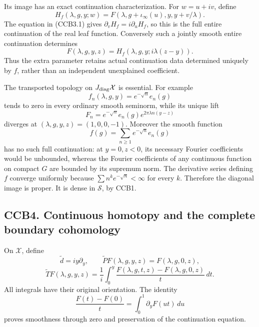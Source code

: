 Its image has an exact continuation characterization. For \(w=u+iv\),
define \[
H_f(\lambda,g,y;w)
=F(\lambda,g+\iota_\infty(u),y,y+v/\lambda).
\] The equation in (CCB3.1) gives \(\partial_vH_f=i\partial_uH_f\), so
this is the full entire continuation of the real leaf function.
Conversely such a jointly smooth entire continuation determines \[
F(\lambda,g,y,z)
=H_f(\lambda,g,y;i\lambda(z-y)).
\tag{CCB3.5}
\] Thus the extra parameter retains actual continuation data determined
uniquely by \(f\), rather than an independent unexplained coefficient.

The transported topology on \(J_{\rm diag}\mathcal X\) is essential. For
example \[
f_n(\lambda,g,y)=e^{-\sqrt n}e_n(g)
\] tends to zero in every ordinary smooth seminorm, while its unique
lift \[
F_n=e^{-\sqrt n}e_n(g)e^{2\pi\lambda n(y-z)}
\] diverges at \((\lambda,g,y,z)=(1,0,0,-1)\). Moreover the smooth
function \[
f(g)=\sum_{n\ge1}e^{-\sqrt n}e_n(g)
\] has no such full continuation: at \(y=0,z<0\), its necessary Fourier
coefficients would be unbounded, whereas the Fourier coefficients of any
continuous function on compact \(G\) are bounded by its supremum norm.
The derivative series defining \(f\) converge uniformly because
\(\sum n^ke^{-\sqrt n}<\infty\) for every \(k\). Therefore the diagonal
image is proper. It is dense in \(\mathcal S\), by CCB1.

\subsection{CCB4. Continuous homotopy and the complete boundary
cohomology}\label{ccb4.-continuous-homotopy-and-the-complete-boundary-cohomology}

On \(\mathcal X\), define \[
\widetilde d=iy\partial_y,\qquad
\widetilde PF(\lambda,g,y,z)=F(\lambda,g,0,z),
\] \[
\widetilde TF(\lambda,g,y,z)
=\frac1i\int_0^y
\frac{F(\lambda,g,t,z)-F(\lambda,g,0,z)}t\,dt.
\tag{CCB4.1}
\] All integrals have their original orientation. The identity \[
\frac{F(t)-F(0)}t=\int_0^1\partial_yF(ut)\,du
\] proves smoothness through zero and preservation of the continuation
equation.

